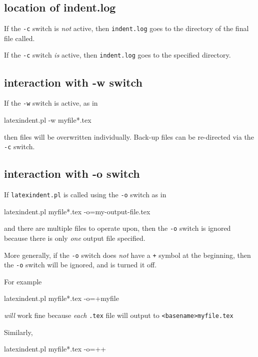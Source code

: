 \documentclass[10pt]{article}
\begin{document}
 \subsection{location of indent.log}
  If the \texttt{-c} switch is \emph{not} active, then \texttt{indent.log} goes to the directory of the final file called.

  If the \texttt{-c} switch \emph{is} active, then \texttt{indent.log} goes to the
  specified directory.

 \subsection{interaction with -w switch}
  If the \texttt{-w} switch is active, as in

  \begin{commandshell}
latexindent.pl -w myfile*.tex
\end{commandshell}

  then files will be overwritten individually. Back-up files can be re-directed via the
  \texttt{-c} switch.

 \subsection{interaction with -o switch}
  If \texttt{latexindent.pl} is called using the \texttt{-o} switch as in

  \begin{commandshell}
latexindent.pl myfile*.tex -o=my-output-file.tex
        \end{commandshell}

  and there are multiple files to operate upon, then the \texttt{-o} switch is ignored
  because there is only \emph{one} output file specified.

  More generally, if the \texttt{-o} switch does \emph{not} have a \texttt{+} symbol at
  the beginning, then the \texttt{-o} switch will be ignored, and is turned it off.

  For example

  \begin{commandshell}
latexindent.pl myfile*.tex -o=+myfile
\end{commandshell}

  \emph{will} work fine because \emph{each} \texttt{.tex} file will output to
  \texttt{<basename>myfile.tex}

  Similarly,

  \begin{commandshell}
latexindent.pl myfile*.tex -o=++
\end{commandshell}
\end{document}
